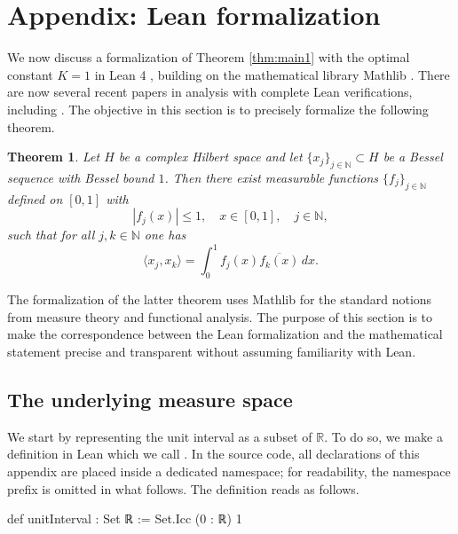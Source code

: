 \documentclass[reqno,a4paper,12pt]{amsart}
\numberwithin{equation}{section}
\newtheorem*{theorem*}{Theorem}
\def\N{{\mathbb N}}
\newcommand\1{\mathds{1}}
\begin{document}
\section{Appendix: Lean formalization}

We now discuss a formalization of Theorem \ref{thm:main1} with the optimal constant $K=1$ in Lean 4 \cite{Moura2021Lean4}, building on the mathematical library Mathlib \cite{mathlib2020}. There are now several recent papers in analysis with complete Lean verifications, including  \cite{armstrong2026formalization, pont2026cantor,hariharan2026milestone,ilin2026semi, miller2026formalization}. The objective in this section is to precisely formalize the following theorem.

\begin{theorem*}
    Let $H$ be a complex Hilbert space and let $\{ x_j \}_{j\in \N}\subset H$ be a Bessel sequence with Bessel bound $1$. Then there exist measurable functions $\{ f_j \}_{j \in \N}$ defined on $[0,1]$ with
    $$
    | f_j(x) | \leq 1, \quad x \in [0,1], \quad j \in \N,
    $$
    such that for all $j,k \in \N$ one has
    \begin{equation}
        \langle x_j,x_k \rangle =  \int_0^1 f_j(x) \overline{f_k(x)} \, dx.
    \end{equation}
\end{theorem*}

The formalization of the latter theorem uses Mathlib \cite{mathlib2020} for the standard notions from measure theory and functional analysis. The purpose of this section
is to make the correspondence between the Lean formalization and the mathematical statement precise and transparent without assuming familiarity with Lean.

\subsection{The underlying measure space}

We start by representing the unit interval as a
subset of $\mathbb{R}$. To do so, we make a definition in Lean which we call . In the source code, all declarations of this appendix are placed inside a dedicated namespace; for readability, the namespace prefix is omitted in what follows. The definition reads as follows.

\begin{leancode}
def unitInterval : Set ℝ :=
  Set.Icc (0 : ℝ) 1
\end{leancode}
\end{document}
